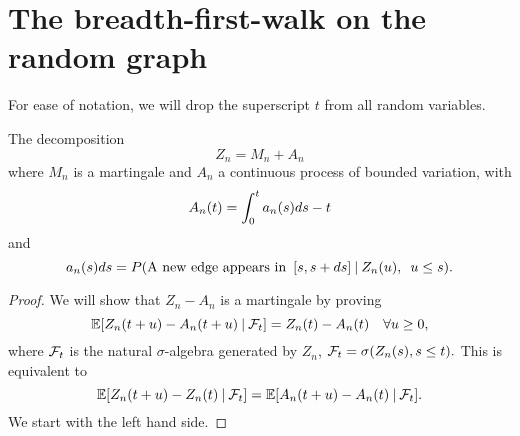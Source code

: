 
\chapter{The breadth-first-walk on the random graph}

For ease of notation, we will drop the superscript $t$ from all random variables.

\begin{lemma}
	The decomposition 
	\begin{equation} \label{decomp Zn}
	Z_n = M_n + A_n
	\end{equation}
	where $M_n$ is a martingale and $A_n$ a continuous process of bounded variation, with
	\begin{equation} \label{def An}
	A_n(t) = \int_{0}^{t} a_n(s)ds - t
	\end{equation}
	and
	\begin{equation} \label{def an}
	a_n(s)ds = P(\text{A new edge appears in} \enspace [s, s+ds] \: | \: Z_n(u), \enspace u \leq s).
	\end{equation}
\end{lemma}
\begin{proof}
	We will show that
	$Z_n - A_n$
	is a martingale by proving
	\begin{equation} \label{Mn martingale}
		\mathbb{E}[ Z_n(t+u) - A_n(t+u) \: | \: \mathcal{F}_{t} ] = Z_n(t) - A_n(t) \quad \forall u \geq 0,
	\end{equation}
	where $\mathcal{F}_{t}$ is the natural $\sigma$-algebra generated by $Z_n$, 
	$\mathcal{F}_{t} = \sigma(Z_n(s), s \leq t).$
	This is equivalent to 
	\begin{equation}
	\mathbb{E}[Z_n(t+u) - Z_n(t) \: | \: \mathcal{F}_{t}] = \mathbb{E}[A_n(t+u) - A_n(t) \: | \: \mathcal{F}_{t}].
	\end{equation}
	We start with the left hand side. 
	
\end{proof}



